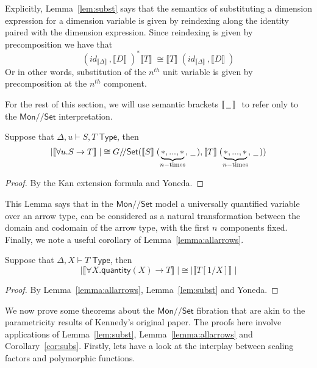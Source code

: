 \documentclass[a4paper,UKenglish]{lipics}
\newcommand{\msf}[1]{\mathsf{#1}} %
\newcommand{\Mon}{\msf{Mon}}
\newcommand{\Set}{\msf{Set}}
\newcommand{\blank}{\, \underline{\hspace{2mm}} \,}
\newcommand{\GroupSet}[1]{#1/\!/\Set}
\newcommand{\MonSet}{\GroupSet{\Mon}}
\newcommand{\GSet}{\GroupSet{G}}
\newcommand{\sem}[1]{\ensuremath{\llbracket #1 \rrbracket} \;}
\newcommand{\qnt}{\msf{quantity}}
\begin{document}
Explicitly, Lemma~\ref{lem:subst} says that the semantics of substituting a dimension expression for a dimension variable is given by reindexing along the identity paired with the dimension expression. Since reindexing is given by precomposition we have that
\[
 (id_{\sem{\Delta}} , \sem{D})^\ast \sem{T} \cong \sem{T}(id_{\sem{\Delta}}, \sem{D})
\]
Or in other words, substitution of the $n^{th}$ unit variable is given by precomposition at the $n^{th}$ component.

For the rest of this section, we will use semantic brackets $\sem{\, \underline{\hspace{2mm}}\, }$ to refer only to the $\MonSet$ interpretation.

\begin{lemma}
\label{lemma:allarrows}
 Suppose that $\Delta, u \vdash S,T \; \msf{ Type}$, then
\[
|\sem{\forall u. S \rightarrow T}| \cong \GSet (\sem{S}(\underbrace{\ast,...,\ast}_{n-\text{times}}, \blank),\sem{T}(\underbrace{\ast,...,\ast}_{n-\text{times}}, \blank))
\]
\end{lemma}
\begin{proof}
By the Kan extension formula and Yoneda.
\end{proof}

This Lemma says that in the $\MonSet$ model a universally quantified variable over an arrow type, can be considered as a natural transformation between the domain and codomain of the arrow type, with the first $n$ components fixed. Finally, we note a useful corollary of Lemma~\ref{lemma:allarrows}.
\begin{corollary}
\label{cor:subs}
Suppose that $\Delta, X \vdash T \; \msf{ Type}$, then
 \[
  |\sem{\forall X . \qnt(X) \rightarrow T}| \cong |\sem{T[1/X]}|
\]
\end{corollary}
\begin{proof}
 By Lemma~\ref{lemma:allarrows}, Lemma~\ref{lem:subst} and Yoneda.
\end{proof}



We now prove some theorems about the $\MonSet$ fibration that are akin to the parametricity results of Kennedy's original paper. The proofs here involve applications of Lemma~\ref{lem:subst}, Lemma~\ref{lemma:allarrows} and Corollary~\ref{cor:subs}. Firstly, lets have a look at the interplay between scaling factors and polymorphic functions.
\end{document}
